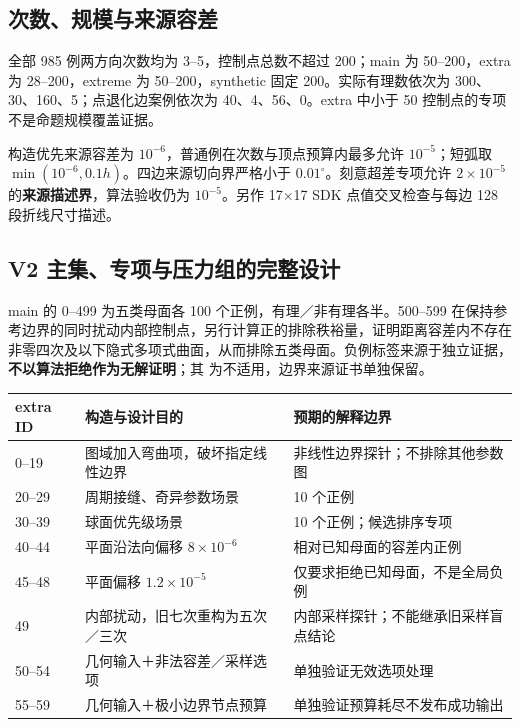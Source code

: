 \documentclass[UTF8,zihao=5,fontset=windows,a4paper]{ctexart}
\newcommand{\code}[1]{\texttt{\detokenize{#1}}}
\begin{document}
\subsection{次数、规模与来源容差}
全部 985 例两方向次数均为 3--5，控制点总数不超过 200；main 为 50--200，extra 为 28--200，extreme 为 50--200，synthetic 固定 200。实际有理数依次为 300、30、160、5；点退化边案例依次为 40、4、56、0。extra 中小于 50 控制点的专项不是命题规模覆盖证据。

构造优先来源容差为 $10^{-6}$，普通例在次数与顶点预算内最多允许 $10^{-5}$；短弧取 $\min(10^{-6},0.1h)$。四边来源切向界严格小于 $0.01^\circ$。刻意超差专项允许 $2\times10^{-5}$ 的\textbf{来源描述界}，算法验收仍为 $10^{-5}$。另作 17×17 SDK 点值交叉检查与每边 128 段折线尺寸描述。

\newpage
\subsection{V2 主集、专项与压力组的完整设计}
main 的 0--499 为五类母面各 100 个正例，有理／非有理各半。500--599 在保持参考边界的同时扰动内部控制点，另行计算正的排除秩裕量，证明距离容差内不存在非零四次及以下隐式多项式曲面，从而排除五类母面。负例标签来源于独立证据，\textbf{不以算法拒绝作为无解证明}；其 \code{source_bound=-1} 为不适用，边界来源证书单独保留。

\begin{center}\small\renewcommand{\arraystretch}{1.18}
\begin{tabularx}{\linewidth}{@{}p{21mm}Y Y@{}}\toprule
extra ID & 构造与设计目的 & 预期的解释边界\\--19 & 图域加入弯曲项，破坏指定线性边界 & 非线性边界探针；不排除其他参数图\\
20--29 & 周期接缝、奇异参数场景 & 10 个正例\\
30--39 & 球面优先级场景 & 10 个正例；候选排序专项\\
40--44 & 平面沿法向偏移 $8\times10^{-6}$ & 相对已知母面的容差内正例\\
45--48 & 平面偏移 $1.2\times10^{-5}$ & 仅要求拒绝已知母面，不是全局负例\\
49 & 内部扰动，旧七次重构为五次／三次 & 内部采样探针；不能继承旧采样盲点结论\\
50--54 & 几何输入＋非法容差／采样选项 & 单独验证无效选项处理\\
55--59 & 几何输入＋极小边界节点预算 & 单独验证预算耗尽不发布成功输出\\\bottomrule
\end{tabularx}
\end{center}
\end{document}
